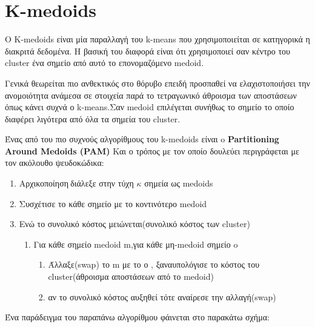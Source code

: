 \section{Κ-medoids}
Ο K-medoids είναι μία παραλλαγή του k-means που χρησιμοποιείται σε κατηγορικά η διακριτά δεδομένα. Η βασική του διαφορά είναι ότι  χρησιμοποιεί σαν κέντρο του cluster ένα σημείο από αυτό το επονομαζόμενο medoid.

Γενικά θεωρείται πιο ανθεκτικός στο θόρυβο επειδή προσπαθεί να ελαχιστοποιήσει την ανομοιότητα ανάμεσα σε στοιχεία παρά το τετραγωνικό άθροισμα των αποστάσεων όπως κάνει συχνά ο k-means.Σαν medoid επιλέγεται συνήθως το σημείο το οποίο διαφέρει λιγότερα από όλα τα σημεία του cluster.


Ένας από του πιο συχνούς αλγορίθμους του k-medoids είναι o\textbf{ Partitioning Around Medoids (PAM)} Και ο τρόπος με τον οποίο δουλεύει 
περιγράφεται με τον ακόλουθο ψευδοκώδικα:
\begin{enumerate}
  \item Αρχικοποίηση$\:$διάλεξε στην τύχη $\kappa$ σημεία ως medoids
  \item Συσχέτισε το κάθε σημείο με το κοντινότερο medoid
  \item Ενώ το συνολικό κόστος  μειώνεται(συνολικό κόστος των cluster)
  \begin{enumerate}
  	\item Για κάθε σημείο medoid m,για κάθε μη-medoid σημείο o
  	\begin{enumerate}
  		\item Άλλαξε(swap) το m με το ο , ξαναυπολόγισε το κόστος του cluster(άθροισμα αποστάσεων από το medoid) 
  		\item αν το συνολικό κόστος αυξηθεί τότε αναίρεσε την αλλαγή(swap) 
  	\end{enumerate}
  \end{enumerate}
\end{enumerate}


\begin{minipage}{\linewidth}%
Ένα παράδειγμα του παραπάνω αλγορίθμου φάινεται στο παρακάτω σχήμα:
	\label{fig:dentro1}%
\end{minipage}